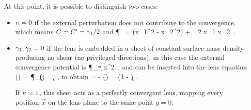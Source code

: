 At this point, it is possible to distinguish two cases:
\begin{itemize}
    \item $\kappa = 0$ if the external perturbation does not contribute to the convergence, which means $C = C^\prime = \gamma_1 / 2$ and
    \be
    \label{eq:3.46}
    \P_\g =  (x_1^2 - x_2^2) + \g_2 x_1 x_2 \,.
    \ee
    \item $\gamma_1, \gamma_2 = 0$ if the lens is embedded in a sheet of constant surface mass density producing no shear (no privileged directions); in this case the external convergence potential is
    \be
    \label{eq:3.47}
    \P_\k =  x^2 \,,
    \ee
    and can be inserted into the lens equation
    \be
    \label{eq:3.48}
    \va{\a} () = \va{\nabla} \P_\k () = \k {} \,,
    \ee
    to obtain
    \be
    \label{eq:3.49}
     =  - \va{\a} () =  (1 - \k) \,.
    \ee

    If $\kappa = 1$, this sheet acts as a perfectly convergent lens, mapping every position $\vec{x}$ on the lens plane to the same point $y=0$.
\end{itemize}